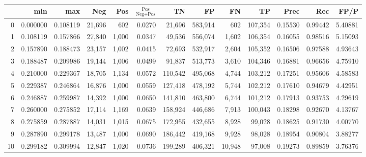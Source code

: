 \begin{tabular}{rrrrrrrrrrrrr}
\toprule
{} &       min &       max &     Neg &    Pos & $\frac{\text{Pos}}{\text{Neg}+\text{Pos}}$ &       TN &       FP &       FN &       TP &     Prec &      Rec &     FP/P \\
\midrule
0  &  0.000000 &  0.108119 &  21,696 &    602 &                                     0.0270 &   21,696 &  583,914 &      602 &  107,354 &  0.15530 &  0.99442 &  5.40881 \\
1  &  0.108119 &  0.157866 &  27,840 &  1,000 &                                     0.0347 &   49,536 &  556,074 &    1,602 &  106,354 &  0.16055 &  0.98516 &  5.15093 \\
2  &  0.157890 &  0.188473 &  23,157 &  1,002 &                                     0.0415 &   72,693 &  532,917 &    2,604 &  105,352 &  0.16506 &  0.97588 &  4.93643 \\
3  &  0.188487 &  0.209986 &  19,144 &  1,006 &                                     0.0499 &   91,837 &  513,773 &    3,610 &  104,346 &  0.16881 &  0.96656 &  4.75910 \\
4  &  0.210000 &  0.229367 &  18,705 &  1,134 &                                     0.0572 &  110,542 &  495,068 &    4,744 &  103,212 &  0.17251 &  0.95606 &  4.58583 \\
5  &  0.229387 &  0.246864 &  16,876 &  1,000 &                                     0.0559 &  127,418 &  478,192 &    5,744 &  102,212 &  0.17610 &  0.94679 &  4.42951 \\
6  &  0.246887 &  0.259987 &  14,392 &  1,000 &                                     0.0650 &  141,810 &  463,800 &    6,744 &  101,212 &  0.17913 &  0.93753 &  4.29619 \\
7  &  0.260000 &  0.275852 &  17,114 &  1,169 &                                     0.0639 &  158,924 &  446,686 &    7,913 &  100,043 &  0.18298 &  0.92670 &  4.13767 \\
8  &  0.275859 &  0.287887 &  14,031 &  1,015 &                                     0.0675 &  172,955 &  432,655 &    8,928 &   99,028 &  0.18625 &  0.91730 &  4.00770 \\
9  &  0.287890 &  0.299178 &  13,487 &  1,000 &                                     0.0690 &  186,442 &  419,168 &    9,928 &   98,028 &  0.18954 &  0.90804 &  3.88277 \\
10 &  0.299182 &  0.309994 &  12,847 &  1,020 &                                     0.0736 &  199,289 &  406,321 &   10,948 &   97,008 &  0.19273 &  0.89859 &  3.76376 \\

\end{tabular}
